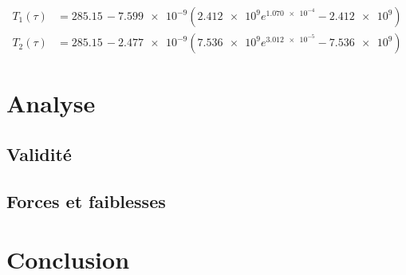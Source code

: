 \documentclass[12pt]{article}
\numberwithin{figure}{section}
\begin{document}
\begin{align*}
    T_1(\tau) &= 285.15\, -\num{7.599e-9} \left(\num{2.412e9} e^{\num{1.070e-4}}-\num{2.412e9}\right)\\
    T_2(\tau) &= 285.15\, -\num{2.477e-9} \left(\num{7.536e9} e^{\num{3.012e-5}}-\num{7.536e9}\right)
\end{align*}

\section{Analyse}
\subsection{Validit\'e}
\subsection{Forces et faiblesses}

\section{Conclusion}

\clearpage
\end{document}
